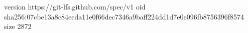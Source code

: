 version https://git-lfs.github.com/spec/v1
oid sha256:07cbe13a8c84eeda11e0f66dec7346a9baff224dd1d7e0e096fb8756396f8574
size 2872

